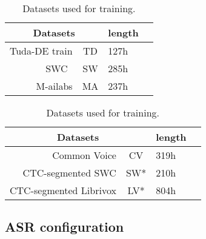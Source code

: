 \documentclass[runningheads]{llncs}
\begin{document}
\begin{table}[tb!]\centering
  \caption{Datasets used for training.}\begin{tabular}{r|c|l l}\toprule
    \multicolumn{2}{c|}{\textbf{Datasets}} & \textbf{length} \\ \midrule
	Tuda-DE train & TD & 127h \\
SWC~\cite{Milde2018} & SW & 285h \\
    M-ailabs & MA & 237h \\ \bottomrule 
    \end{tabular}
\qquad
  \begin{tabular}{r|c|l l}\toprule
    \multicolumn{2}{c|}{\textbf{Datasets}} & \textbf{length} \\ \midrule
    Common Voice & CV & 319h \\
    CTC-segmented SWC & SW* & 210h \\ 
    CTC-segmented Librivox & LV* & 804h \\ \bottomrule 
    \end{tabular}
  \label{table:datasets}
\end{table}


\subsection{ASR configuration}
\end{document}
